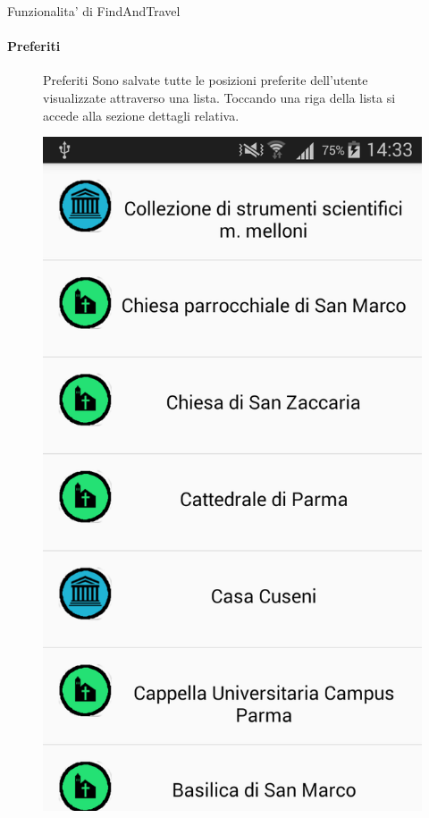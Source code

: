 \documentclass[10pt,a4paper]{beamer}
\begin{document}
\begin{frame}{Funzionalita' di FindAndTravel}
\framesubtitle{Preferiti}
\begin{figure}
\begin{minipage}{0.45\textwidth}
 \begin{block}{Preferiti}
 Sono salvate tutte le posizioni preferite dell'utente visualizzate attraverso una lista. Toccando una riga della lista si accede alla sezione dettagli relativa.
 \end{block}
\end{minipage}
\hfill
\begin{minipage}{0.35\textwidth}
  \includegraphics[scale=0.1]{preferiti.png}
\end{minipage}
\end{figure}
\end{frame}
\end{document}
